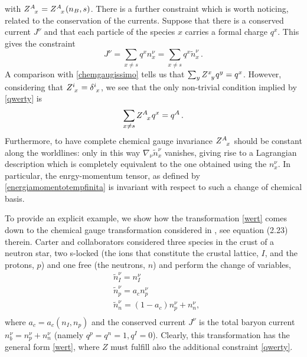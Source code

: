 \documentclass[usenatbib]{mnras}
\begin{document}
%
with $Z\indices{^A _x}= Z\indices{^A _x}(n_B,s)$. There is a further constraint which is worth noticing, related to the conservation of the currents. Suppose that there is a conserved current $J^\nu$ and that each particle of the species $x$ carries a formal charge $q^x$. This gives the constraint
%
\begin{equation}
J^\nu = \sum_{x \neq s} q^x n_x^\nu = \sum_{{x} \neq s} q^{x} \tilde{n}_{x}^\nu \, .
\label{qwerty}
\end{equation}
%
A comparison with \eqref{chemgaugissimo} tells us that $\sum_{y}  Z\indices{^x _{y}}q^{y} = q^x$. However, considering that $Z\indices{^i_{x}}= \delta\indices{^i _{x}}$, we see that   the only non-trivial condition implied by \eqref{qwerty} is
%
\begin{equation}
\sum_{x \neq s} Z\indices{^A _x}q^x = q^A \, .
\end{equation}
%
Furthermore, to have complete chemical gauge invariance $Z\indices{^A_x}$ should be constant along the worldlines: only in this way $\nabla_\nu \tilde{n}_x^\nu$ vanishes, giving rise to a Lagrangian description which is completely equivalent to the one obtained using the $n_x^\nu$.  In particular, the enrgy-momentum tensor, as defined by \eqref{energiamomentotempfinita} is invariant with respect to such a change of chemical basis. 

To provide an explicit example, we show how  the transformation \eqref{wert} comes down to the chemical gauge transformation considered in \cite{carter_macro_2006}, see equation (2.23) therein. Carter and collaborators considered three species in the crust of a neutron star, two s-locked (the ions that constitute the crustal lattice, $I$, and the protons, $p$) and one free (the neutrons, $n$) and perform the change of variables, 
%
\begin{equation}
\begin{split}
& \tilde{n}_I^\nu = n_I^\nu \\
& \tilde{n}_p^\nu = a_c n_p^\nu \\
& \tilde{n}_n^\nu = (1-a_c)n_p^\nu + n_n^\nu, \\
\end{split}
\end{equation}
%
where $a_c=a_c(n_I,n_p)$ and the conserved current  $J^\nu$ is the total baryon current $n_b^\nu=n_p^\nu+n_n^\nu$ (namely $q^p=q^n =1, q^I=0$). Clearly, this transformation has the general form \eqref{wert}, where $Z$ must fulfill also the additional constraint \eqref{qwerty}.
\end{document}
